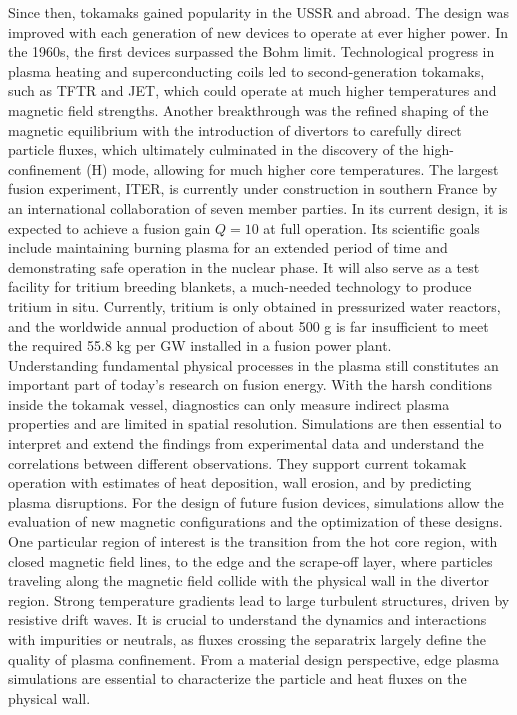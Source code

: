 Since then, tokamaks gained popularity in the USSR and abroad. The design was improved with each generation of new devices to operate at ever higher power. In the 1960s, the first devices surpassed the Bohm limit\cite{kadomtsev1992tokamak}. Technological progress in plasma heating and superconducting coils led to second-generation tokamaks, such as TFTR and JET, which could operate at much higher temperatures and magnetic field strengths. Another breakthrough was the refined shaping of the magnetic equilibrium with the introduction of divertors to carefully direct particle fluxes, which ultimately culminated in the discovery of the high-confinement (H) mode, allowing for much higher core temperatures. The largest fusion experiment, ITER, is currently under construction in southern France by an international collaboration of seven member parties. In its current design, it is expected to achieve a fusion gain $Q=10$ at full operation. Its scientific goals include maintaining burning plasma for an extended period of time and demonstrating safe operation in the nuclear phase. It will also serve as a test facility for tritium breeding blankets, a much-needed technology to produce tritium in situ. Currently, tritium is only obtained in pressurized water reactors, and the worldwide annual production of about 500 g is far insufficient to meet the required 55.8 kg per GW installed in a fusion power plant\cite{abdou2020physics}. \\

Understanding fundamental physical processes in the plasma still constitutes an important part of today's research on fusion energy. With the harsh conditions inside the tokamak vessel, diagnostics can only measure indirect plasma properties and are limited in spatial resolution. Simulations are then essential to interpret and extend the findings from experimental data and understand the correlations between different observations. They support current tokamak operation with estimates of heat deposition, wall erosion, and by predicting plasma disruptions. For the design of future fusion devices, simulations allow the evaluation of new magnetic configurations and the optimization of these designs. One particular region of interest is the transition from the hot core region, with closed magnetic field lines, to the edge and the scrape-off layer, where particles traveling along the magnetic field collide with the physical wall in the divertor region. Strong temperature gradients lead to large turbulent structures, driven by resistive drift waves. It is crucial to understand the dynamics and interactions with impurities or neutrals, as fluxes crossing the separatrix largely define the quality of plasma confinement. From a material design perspective, edge plasma simulations are essential to characterize the particle and heat fluxes on the physical wall. \\


